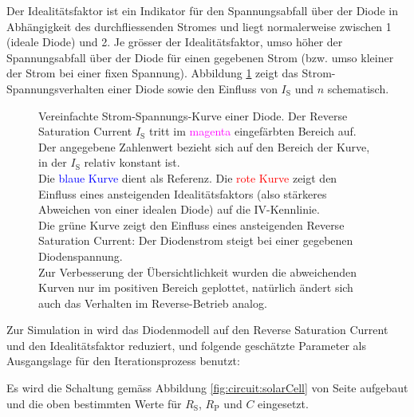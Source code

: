 Der Idealit\"atsfaktor ist ein Indikator  f\"ur den Spannungsabfall \"uber der
Diode in  Abh\"angigkeit des durchfliessenden Stromes  und liegt normalerweise
zwischen  1  (ideale  Diode)   und  2. Je  gr\"osser  der  Idealit\"atsfaktor,
umso  h\"oher  der Spannungsabfall  \"uber  der  Diode f\"ur  einen  gegebenen
Strom  (bzw.  umso kleiner  der  Strom  bei einer  fixen  Spannung). Abbildung
\ref{fig:diodeVI:IS} zeigt das Strom-Spannungsverhalten  einer Diode sowie den
Einfluss von $I_{\mathrm{S}}$ und $n$ schematisch.

\begin{figure}[h!tb]
    
    \caption{%
        Vereinfachte Strom-Spannungs-Kurve einer Diode. Der Reverse Saturation
        Current   $I_{\mathrm{S}}$   tritt   im   \textcolor{magenta}{magenta}
        eingef\"arbten Bereich auf. Der angegebene Zahlenwert bezieht sich auf
        den  Bereich  der  Kurve,  in der  $I_{\mathrm{S}}$  relativ  konstant
        ist.\protect\\
        Die    \textcolor{blue}{blaue   Kurve}    dient   als    Referenz. Die
        \textcolor{red}{rote  Kurve}  zeigt  den Einfluss  eines  ansteigenden
        Idealit\"atsfaktors  (also  st\"arkeres  Abweichen von  einer  idealen
        Diode) auf die IV-Kennlinie.\protect\\
        Die \textcolor{green!50!black}{gr\"une Kurve} zeigt den Einfluss eines
        ansteigenden  Reverse Saturation  Current: Der Diodenstrom  steigt bei
        einer gegebenen Diodenspannung.\protect\\
        Zur  Verbesserung  der  \"Ubersichtlichkeit  wurden  die  abweichenden
        Kurven nur  im positiven Bereich geplottet,  nat\"urlich \"andert sich
        auch das Verhalten im Reverse-Betrieb analog.%
    }
    \label{fig:diodeVI:IS}
\end{figure}


Zur  Simulation  in    wird das  Diodenmodell  auf  den  Reverse
Saturation  Current   und  den  Idealit\"atsfaktor  reduziert,   und  folgende
gesch\"atzte Parameter als Ausgangslage f\"ur den Iterationsprozess benutzt:

\begin{center}
\end{center}

Es wird die Schaltung gem\"ass Abbildung \ref{fig:circuit:solarCell} von Seite
\pageref{fig:circuit:solarCell} aufgebaut und die  oben bestimmten Werte f\"ur
$R_{\mathrm{S}}$, $R_{\mathrm{P}}$ und $C$ eingesetzt.

